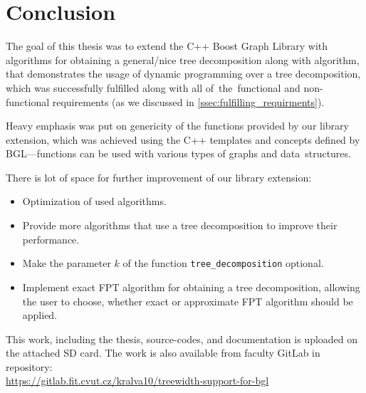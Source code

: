 \documentclass[thesis=B,english]{FITthesis}[2019/03/21]
\begin{document}
\chapter{Conclusion}
The goal of this thesis was to extend the C++ Boost Graph Library with algorithms for obtaining a general/nice tree decomposition along with algorithm, that demonstrates the usage of dynamic programming over a tree decomposition, which was successfully fulfilled along with all of~the~functional and non-functional requirements (as we discussed in \autoref{ssec:fulfilling_requirments}).

Heavy emphasis was put on genericity of the functions provided by our library extension, which was achieved using the C++ templates and concepts defined by BGL---functions can be used with various types of graphs and data~structures.

There is lot of space for further improvement of our library extension:

\begin{itemize}
	\item Optimization of used algorithms.
	\item Provide more algorithms that use a tree decomposition to improve their performance.
	\item Make the parameter $k$ of the function \texttt{tree\_decomposition} optional.
	\item Implement exact FPT algorithm for obtaining a tree decomposition, allowing the user to choose, whether exact or approximate FPT algorithm should be applied. 
\end{itemize}

This work, including the thesis, source-codes, and documentation is uploaded on the attached SD card. The work is also available from faculty GitLab in repository:\\ \url{https://gitlab.fit.cvut.cz/kralva10/treewidth-support-for-bgl}

%
%
\printbibliography

\appendix
\end{document}
